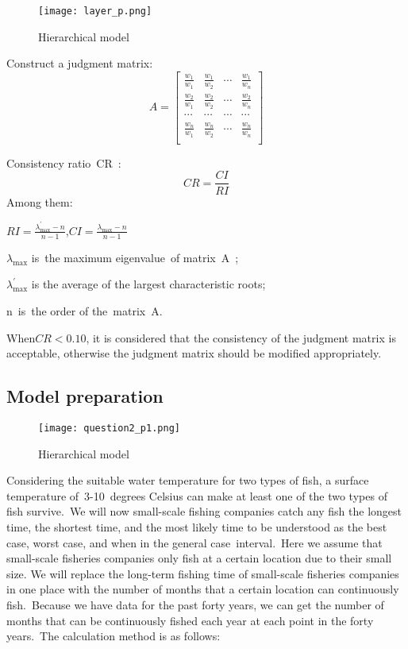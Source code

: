 \documentclass{mcmthesis}
\begin{document}
\begin{figure}[!htp]
	\centering
	\texttt{[image: layer\_p.png]}\\
	\caption{Hierarchical model}
\end{figure}

Construct a judgment matrix:
\begin{equation}
A=\left[\begin{array}{cccc}
{\frac{w_{1}}{w_{1}}} & {\frac{w_{1}}{w_{2}}} & {\cdots} & {\frac{w_{1}}{w_{n}}} \\
{\frac{w_{2}}{w_{1}}} & {\frac{w_{2}}{w_{2}}} & {\cdots} & {\frac{w_{2}}{w_{n}}} \\
\cdots &\cdots &\cdots  &\cdots\\
{\frac{w_{n}}{w_{1}}} & {\frac{w_{n}}{w_{2}}} & {\cdots} & {\frac{w_{n}}{w_{n}}} \\
\end{array}\right]
\end{equation}

Consistency ratio CR :
\begin{equation}
C R=\frac{C I}{R I}
\end{equation}
Among them:

$R I=\frac{\lambda_{\max }^{\prime}-n}{n-1}$,$C I=\frac{\lambda_{\max }-n}{n-1}$

$\lambda_{\max }$ is the maximum eigenvalue of matrix A ;

$\lambda_{\max }^{'}$ is the average of the largest characteristic roots;

n is the order of the matrix A.

When$ CR < 0.10 $, it is considered that the consistency of the judgment matrix is acceptable, otherwise the judgment matrix should be modified appropriately.

\subsection{Model preparation}
\begin{figure}[!htp]
	\centering
	\texttt{[image: question2\_p1.png]}\\
	\caption{Hierarchical model}
\end{figure}
Considering the suitable water temperature for two types of fish, a surface temperature of 3-10 degrees Celsius can make at least one of the two types of fish survive. We will now small-scale fishing companies catch any fish the longest time, the shortest time, and the most likely time to be understood as the best case, worst case, and when in the general case interval. Here we assume that small-scale fisheries companies only fish at a certain location due to their small size. We will replace the long-term fishing time of small-scale fisheries companies in one place with the number of months that a certain location can continuously fish. Because we have data for the past forty years, we can get the number of months that can be continuously fished each year at each point in the forty years. The calculation method is as follows:
\end{document}

